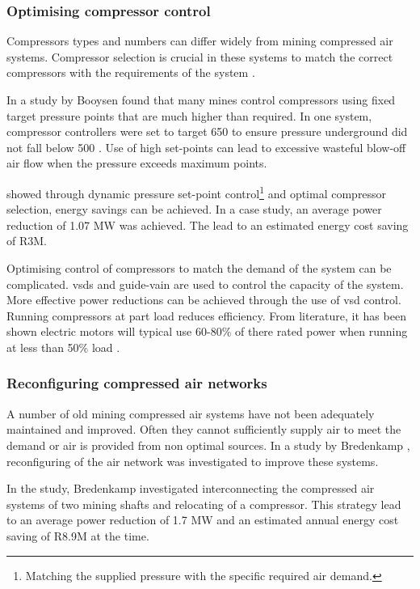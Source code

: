 		\subsubsection{Optimising compressor control}
		Compressors types and numbers can differ widely from mining compressed air systems. Compressor selection is crucial in these systems to match the correct compressors with the requirements of the system \cite{marais2010expert}.
		\par 
		In a study by Booysen \cite{Booysen2012Masters} found that many mines control compressors using fixed target pressure points that are much higher than required. In one system, compressor controllers were set to target 650  to ensure pressure underground did not fall below 500 . Use of high set-points can lead to excessive wasteful blow-off air flow when the pressure exceeds maximum points.
		\par
		 \cite{booysen2009optimising} showed through dynamic pressure set-point control\footnote{Matching the supplied pressure with the specific required air demand.} and optimal compressor selection, energy savings can be achieved. In a case study, an average power reduction of 1.07 MW was achieved. The lead to an estimated energy cost saving of R3M.
		\par 
	 	Optimising control of compressors to match the demand of the system can be complicated. \glspl{vsd} and guide-vain are used to control the capacity of the system. More effective power reductions can be achieved through the use of \gls{vsd} control. Running compressors at part load reduces efficiency. From literature, it has been shown electric motors will typical use 60-80\% of there rated power when running at less than 50\% load \cite{Saidur2010}.
		\subsubsection{Reconfiguring compressed air networks}
			A number of old mining compressed air systems  have not been adequately maintained and improved. Often they cannot sufficiently supply air to meet the demand or air is provided from non optimal sources. In a study by Bredenkamp \cite{Bredenkamp2013Masters}, reconfiguring of the air network was investigated to improve these systems.
			\par  
			In the study, Bredenkamp investigated interconnecting the compressed air systems of two mining shafts and relocating of a compressor. This strategy lead to an average power reduction of 1.7 MW and an estimated annual energy cost saving of R8.9M at the time.
			
